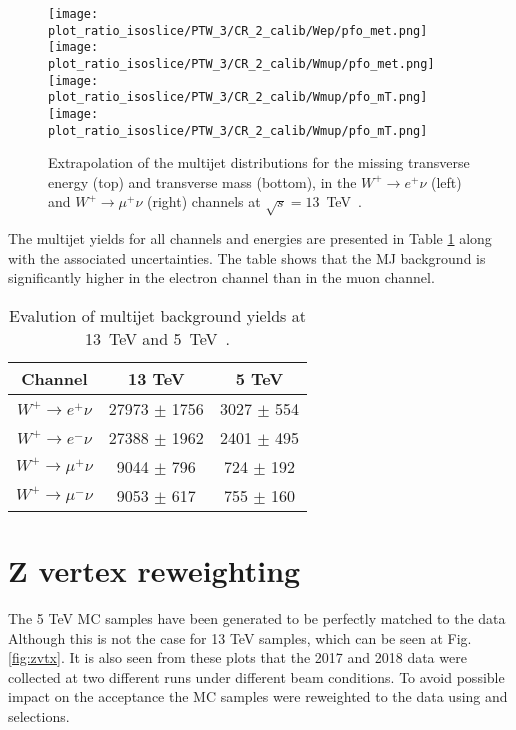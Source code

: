 \begin{figure}[htbp]
	\texttt{[image: plot\_ratio\_isoslice/PTW\_3/CR\_2\_calib/Wep/pfo\_met.png]}
	\texttt{[image: plot\_ratio\_isoslice/PTW\_3/CR\_2\_calib/Wmup/pfo\_met.png]}\\
	\texttt{[image: plot\_ratio\_isoslice/PTW\_3/CR\_2\_calib/Wmup/pfo\_mT.png]}
	\texttt{[image: plot\_ratio\_isoslice/PTW\_3/CR\_2\_calib/Wmup/pfo\_mT.png]}\\
	\caption{Extrapolation of the multijet distributions for the missing transverse energy (top) and transverse mass (bottom), in the $W^+\to e^+\nu$ (left) and $W^+\to \mu^+\nu$ (right) channels at $\sqrt{s}=13$~TeV~\cite{mjets_int_note_6}.}
	\label{fig:mjbkg-shape}
\end{figure}
The multijet yields for all channels and energies are presented in Table \ref{table:mj_summary} along with the associated uncertainties. The table shows that the MJ background is significantly higher in the electron channel than in the muon channel. 
\begin{table}[h!]
	\begin{center}
		\begin{tabular}{|c|c|c|}
			\hline
			Channel & 13 TeV & 5 TeV \\
			\hline
			$W^+\to e^{+}\nu$ & 27973 $\pm$ 1756 &  3027 $\pm$ 554 \\
			$W^+\to e^{-}\nu$ & 27388 $\pm$ 1962 &  2401 $\pm$ 495 \\
			$W^+\to \mu^{+}\nu$ & 9044 $\pm$ 796 &  724 $\pm$ 192 \\
			$W^+\to \mu^{-}\nu$ & 9053 $\pm$ 617 & 755 $\pm$ 160 \\
			\hline
		\end{tabular}
		\caption{Evalution of multijet background yields at 13~TeV and 5~TeV~\cite{mjets_int_note_6}.}
		\label{table:mj_summary}
	\end{center}
\end{table}
\clearpage
     \section{Z vertex reweighting }
The 5 TeV MC samples have been generated to be perfectly matched to the data 
Although this is not the case for 13 TeV samples, which can be seen at Fig. \ref{fig:zvtx}. 
It is also seen from these plots that the 2017 and 2018 data were collected at two different runs under different beam conditions. 
To avoid possible impact on the acceptance the MC samples were reweighted to the data using \Zee and \Zmm selections.

